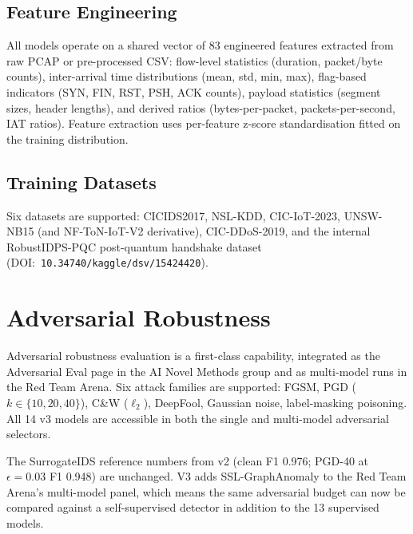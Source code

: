 \documentclass[11pt,a4paper]{article}
\begin{document}
\subsection{Feature Engineering}
All models operate on a shared vector of 83 engineered features
extracted from raw PCAP or pre-processed CSV: flow-level statistics
(duration, packet/byte counts), inter-arrival time distributions
(mean, std, min, max), flag-based indicators (SYN, FIN, RST, PSH, ACK
counts), payload statistics (segment sizes, header lengths), and
derived ratios (bytes-per-packet, packets-per-second, IAT ratios).
Feature extraction uses per-feature z-score standardisation fitted on
the training distribution.

\subsection{Training Datasets}
Six datasets are supported: CICIDS2017, NSL-KDD, CIC-IoT-2023,
UNSW-NB15 (and NF-ToN-IoT-V2 derivative), CIC-DDoS-2019, and the
internal RobustIDPS-PQC post-quantum handshake dataset
(DOI:~\texttt{10.34740/kaggle/dsv/15424420}).

\section{Adversarial Robustness}
\label{sec:adversarial}

Adversarial robustness evaluation is a first-class capability,
integrated as the Adversarial Eval page in the AI Novel Methods group
and as multi-model runs in the Red Team Arena.  Six attack families
are supported: FGSM, PGD ($k \in \{10, 20, 40\}$), C\&W ($\ell_2$),
DeepFool, Gaussian noise, label-masking poisoning.  All 14 v3 models
are accessible in both the single and multi-model adversarial
selectors.

The SurrogateIDS reference numbers from v2 (clean F1 0.976; PGD-40 at
$\epsilon{=}0.03$ F1 0.948) are unchanged.  V3 adds SSL-GraphAnomaly
to the Red Team Arena's multi-model panel, which means the same
adversarial budget can now be compared against a self-supervised
detector in addition to the 13 supervised models.

\end{document}
